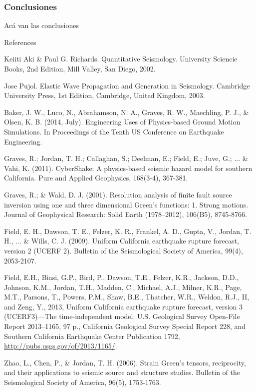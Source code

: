 %
%
\begin{frame}[allowframebreaks]
\frametitle{Conclusiones}
%
\justifying
%
Acá van las conclusiones
%
\end{frame}
%
%
\begin{frame}[allowframebreaks]{References}
\def\newblock{}
%
%

\begin{thebibliography}{1}

 Keiiti Aki \& Paul G. Richards. {Q}uantitative {S}eismology. University Sciencie Books, 2nd Edition, Mill Valley, San Diego, 2002.

 Jose Pujol. Elastic Wave Propagation and Generation in Seismology. Cambridge University Press, 1st Edition, Cambridge, United Kingdom, 2003.

 Baker, J. W., Luco, N., Abrahamson, N. A., Graves, R. W., Maechling, P. J., \& Olsen, K. B. (2014, July). Engineering Uses of Physics-based Ground Motion Simulations. In Proceedings of the Tenth US Conference on Earthquake Engineering.

 Graves, R.; Jordan, T. H.; Callaghan, S.; Deelman, E.; Field, E.; Juve, G.; ... \& Vahi, K. (2011). CyberShake: A physics-based seismic hazard model for southern California. Pure and Applied Geophysics, 168(3-4), 367-381.

 Graves, R.; \& Wald, D. J. (2001). Resolution analysis of finite fault source inversion using one and three dimensional Green's functions: 1. Strong motions. Journal of Geophysical Research: Solid Earth (1978–2012), 106(B5), 8745-8766.

 Field, E. H., Dawson, T. E., Felzer, K. R., Frankel, A. D., Gupta, V., Jordan, T. H., ... \& Wills, C. J. (2009). Uniform California earthquake rupture forecast, version 2 (UCERF 2). Bulletin of the Seismological Society of America, 99(4), 2053-2107.

 Field, E.H., Biasi, G.P., Bird, P., Dawson, T.E., Felzer, K.R., Jackson, D.D., Johnson, K.M., Jordan, T.H., Madden, C., Michael, A.J., Milner, K.R., Page, M.T., Parsons, T., Powers, P.M., Shaw, B.E., Thatcher, W.R., Weldon, R.J., II, and Zeng, Y., 2013, Uniform California earthquake rupture forecast, version 3 (UCERF3)—The time-independent model: U.S. Geological Survey Open-File Report 2013–1165, 97 p., California Geological Survey Special Report 228, and Southern California Earthquake Center Publication 1792, \url{http://pubs.usgs.gov/of/2013/1165/}.

 Zhao, L., Chen, P., \& Jordan, T. H. (2006). Strain Green’s tensors, reciprocity, and their applications to seismic source and structure studies. Bulletin of the Seismological Society of America, 96(5), 1753-1763.

\end{thebibliography}

\end{frame}




